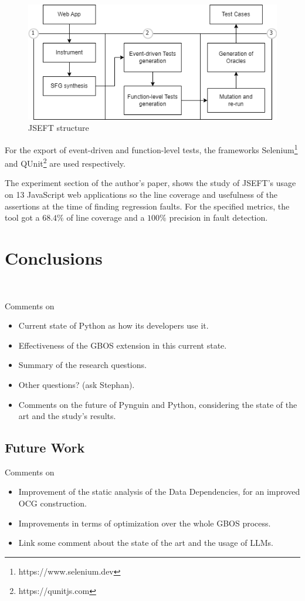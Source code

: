 \documentclass[%
  chapterprefix=false,%
  open=right,%
  twoside=true,%
  paper=a4,%
  logofile={Figures/logo.png},%
  thesistype=master,%
  UKenglish,%
]{se2thesis}
\begin{document}
\begin{figure}[tb]
  \centering 
  \includegraphics[width=.99\textwidth]{Figures/jseft2.png}
  \caption{JSEFT structure}\label{fig:jseft}
\end{figure}

For the export of event-driven and function-level tests, the frameworks Selenium\footnote{https://www.selenium.dev} and QUnit\footnote{https://qunitjs.com} are used respectively.

The experiment section of the author's paper, shows the study of JSEFT's usage on 13 JavaScript web applications so the line coverage and usefulness of the assertions at the time of finding regression faults.
For the specified metrics, the tool got a \(68.4\%\) of line coverage and a \(100\%\) precision in fault detection.

\chapter{Conclusions}~\label{chap:conclusions}

Comments on
\begin{itemize}
  \item Current state of Python as how its developers use it.
  \item Effectiveness of the GBOS extension in this current state.
  \item Summary of the research questions.
  \item Other questions? (ask Stephan).
  \item Comments on the future of Pynguin and Python, considering the state of the art and the study's results.
\end{itemize}

\section{Future Work}

Comments on
\begin{itemize}
  \item Improvement of the static analysis of the Data Dependencies, for an improved OCG construction.
  \item Improvements in terms of optimization over the whole GBOS process.
  \item Link some comment about the state of the art and the usage of LLMs.
\end{itemize}

\backmatter{}

\printbibliography{}
\end{document}

